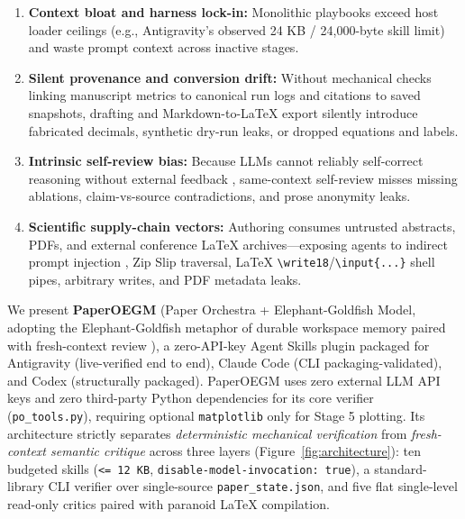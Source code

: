 \begin{enumerate}
\def\labelenumi{\arabic{enumi}.}
\tightlist
\item
  \textbf{Context bloat and harness lock-in:} Monolithic playbooks exceed host loader ceilings (e.g., Antigravity's observed 24 KB / 24,000-byte skill limit) and waste prompt context across inactive stages.
\item
  \textbf{Silent provenance and conversion drift:} Without mechanical checks linking manuscript metrics to canonical run logs and citations to saved snapshots, drafting and Markdown-to-LaTeX export silently introduce fabricated decimals, synthetic dry-run leaks, or dropped equations and labels.
\item
  \textbf{Intrinsic self-review bias:} Because LLMs cannot reliably self-correct reasoning without external feedback \citep{huang2024selfcorrect}, same-context self-review misses missing ablations, claim-vs-source contradictions, and prose anonymity leaks.
\item
  \textbf{Scientific supply-chain vectors:} Authoring consumes untrusted abstracts, PDFs, and external conference LaTeX archives---exposing agents to indirect prompt injection \citep{greshake2023indirect}, Zip Slip traversal, LaTeX \texttt{\textbackslash{}write18}/\allowbreak{}\texttt{\textbackslash{}input\{\textbar{}...\}} shell pipes, arbitrary writes, and PDF metadata leaks.
\end{enumerate}

We present \textbf{PaperOEGM} (Paper Orchestra + Elephant-Goldfish Model, adopting the Elephant-Goldfish metaphor of durable workspace memory paired with fresh-context review \citep{google2026egm}), a zero-API-key Agent Skills plugin packaged for Antigravity (live-verified end to end), Claude Code (CLI packaging-validated), and Codex (structurally packaged). PaperOEGM uses zero external LLM API keys and zero third-party Python dependencies for its core verifier (\texttt{po\_\allowbreak{}tools.\allowbreak{}py}), requiring optional \texttt{matplotlib} only for Stage 5 plotting. Its architecture strictly separates \emph{deterministic mechanical verification} from \emph{fresh-context semantic critique} across three layers (Figure~\ref{fig:architecture}): ten budgeted skills (\texttt{\textless{}=\ 12\ KB}, \texttt{disable-model-invocation:\ true}), a standard-library CLI verifier over single-source \texttt{paper\_\allowbreak{}state.\allowbreak{}json}, and five flat single-level read-only critics paired with paranoid LaTeX compilation.

